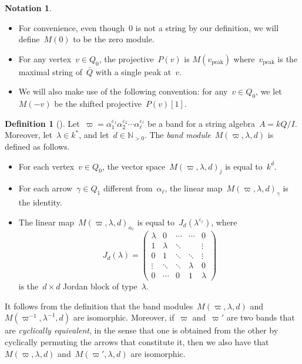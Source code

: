 \documentclass{amsart}
\theoremstyle{definition}
\newtheorem{definition}[theorem]{Definition}
\newtheorem{notation}[theorem]{Notation}
\newcommand{\N}{\mathbb{N}} %
\newcommand{\darkblue}{\color{darkblue}} %
\newcommand{\defn}[1]{\textsl{\darkblue #1}} %
\newcommand{\peak}{\mathrm{peak}} %
\begin{document}
\begin{notation}
 \begin{itemize}
  \item For convenience, even though~$0$ is not a string by our definition, we will define~$M(0)$ to be the zero module.
  \item For any vertex~$v \in Q_0$, the projective~$P(v)$ is $M(v_\peak)$ where~$v_\peak$ is the maximal string of~$\bar Q$ with a single peak at~$v$.
  \item We will also make use of the following convention: for any~$v\in Q_0$, we let~$M(-v)$ be the shifted projective~$P(v)[1]$.
 \end{itemize}
\end{notation}

\begin{definition}[\cite{ButlerRingel}]
Let~$\varpi = \alpha_1^{\varepsilon_1}\alpha_2^{\varepsilon_2}\cdots \alpha_\ell^{\varepsilon_\ell}$ be a band for a string algebra~$A=kQ/I$.
Moreover, let~$\lambda\in k^*$, and let~$d \in \N_{>0}$.
The \defn{band module}~$M(\varpi, \lambda, d)$ is defined as follows.
  \begin{itemize}
    \item For each vertex~$v \in Q_0$, the vector space~$M(\varpi, \lambda, d)_j$ is equal to~$k^d$.
    \item For each arrow~$\gamma \in Q_1$ different from~$\alpha_\ell$, the linear map~$M(\varpi, \lambda, d)_\gamma$ is the identity.
    \item The linear map~$M(\varpi, \lambda, d)_{\alpha_\ell}$ is equal to~$J_d(\lambda^{\varepsilon_\ell})$, where
     \[
        J_d(\lambda) =
        \begin{pmatrix} 
        \lambda & 0 & \cdots & \cdots & 0 \\
        1 & \lambda & \ddots & & \vdots \\
        0 & 1 & \ddots & \ddots & \vdots \\
        \vdots & \ddots & \ddots & \lambda & 0 \\
        0 & \cdots & 0 & 1 & \lambda                                        
        \end{pmatrix}
     \]
    is the~$d\times d$ Jordan block of type~$\lambda$.
  \end{itemize}
\end{definition}

It follows from the definition that the band modules~$M(\varpi, \lambda, d)$ and~$M(\varpi^{-1}, \lambda^{-1}, d)$ are isomorphic.  Moreover, if~$\varpi$ and~$\varpi'$ are two bands that are \defn{cyclically equivalent}, in the sense that one is obtained from the other by cyclically permuting the arrows that constitute it, then we also have that~$M(\varpi, \lambda, d)$ and~$M(\varpi', \lambda, d)$ are isomorphic.
\end{document}
